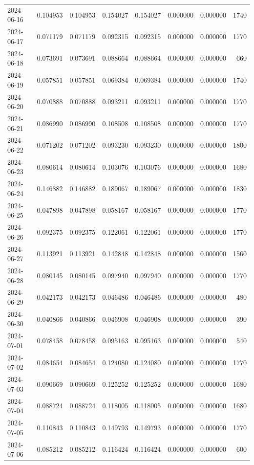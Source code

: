 \begin{tabular}{lrrrrrrr}
2024-06-16 & 0.104953 & 0.104953 & 0.154027 & 0.154027 & 0.000000 & 0.000000 & 1740 \\
2024-06-17 & 0.071179 & 0.071179 & 0.092315 & 0.092315 & 0.000000 & 0.000000 & 1770 \\
2024-06-18 & 0.073691 & 0.073691 & 0.088664 & 0.088664 & 0.000000 & 0.000000 & 660 \\
2024-06-19 & 0.057851 & 0.057851 & 0.069384 & 0.069384 & 0.000000 & 0.000000 & 1740 \\
2024-06-20 & 0.070888 & 0.070888 & 0.093211 & 0.093211 & 0.000000 & 0.000000 & 1770 \\
2024-06-21 & 0.086990 & 0.086990 & 0.108508 & 0.108508 & 0.000000 & 0.000000 & 1770 \\
2024-06-22 & 0.071202 & 0.071202 & 0.093230 & 0.093230 & 0.000000 & 0.000000 & 1800 \\
2024-06-23 & 0.080614 & 0.080614 & 0.103076 & 0.103076 & 0.000000 & 0.000000 & 1680 \\
2024-06-24 & 0.146882 & 0.146882 & 0.189067 & 0.189067 & 0.000000 & 0.000000 & 1830 \\
2024-06-25 & 0.047898 & 0.047898 & 0.058167 & 0.058167 & 0.000000 & 0.000000 & 1770 \\
2024-06-26 & 0.092375 & 0.092375 & 0.122061 & 0.122061 & 0.000000 & 0.000000 & 1770 \\
2024-06-27 & 0.113921 & 0.113921 & 0.142848 & 0.142848 & 0.000000 & 0.000000 & 1560 \\
2024-06-28 & 0.080145 & 0.080145 & 0.097940 & 0.097940 & 0.000000 & 0.000000 & 1770 \\
2024-06-29 & 0.042173 & 0.042173 & 0.046486 & 0.046486 & 0.000000 & 0.000000 & 480 \\
2024-06-30 & 0.040866 & 0.040866 & 0.046908 & 0.046908 & 0.000000 & 0.000000 & 390 \\
2024-07-01 & 0.078458 & 0.078458 & 0.095163 & 0.095163 & 0.000000 & 0.000000 & 540 \\
2024-07-02 & 0.084654 & 0.084654 & 0.124080 & 0.124080 & 0.000000 & 0.000000 & 1770 \\
2024-07-03 & 0.090669 & 0.090669 & 0.125252 & 0.125252 & 0.000000 & 0.000000 & 1680 \\
2024-07-04 & 0.088724 & 0.088724 & 0.118005 & 0.118005 & 0.000000 & 0.000000 & 1680 \\
2024-07-05 & 0.110843 & 0.110843 & 0.149793 & 0.149793 & 0.000000 & 0.000000 & 1770 \\
2024-07-06 & 0.085212 & 0.085212 & 0.116424 & 0.116424 & 0.000000 & 0.000000 & 600 \\

\end{tabular}
